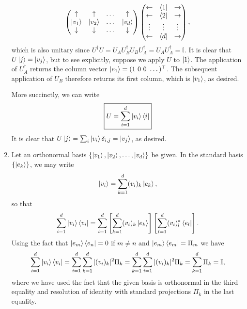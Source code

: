 \documentclass{article}
\theoremstyle{definition}
\newcommand{\lb}{\left[}
\newcommand{\rb}{\right]}
\begin{document}
\begin{enumerate}[label=(\alph*)]
\begin{align*}
\begin{pmatrix}
			\uparrow & \uparrow& \dots & \uparrow\\
			\ket{v_1}& \ket{v_2}& \dots & \ket{v_d}\\
			\downarrow& \downarrow& \dots&\downarrow 
		\end{pmatrix} 
	\begin{pmatrix}
		\leftarrow & \bra{1} &\rightarrow \\
		\leftarrow & \bra{2} &\rightarrow \\
		\vdots & \vdots &\vdots \\
		\leftarrow & \bra{d} &\rightarrow 
	\end{pmatrix},
	\end{align*}
	which is also unitary since $U^\dagger U = U_A U_B^\dagger U_B U_A^\dagger = U_AU_A^\dagger = \mathbb{I}$. It is clear that $U\ket{j} = \ket{v_j}$, but to see explicitly, suppose we apply $U$ to $\ket{1}$. The application of $U_A^\dagger$ returns the column vector $\ket{e_1} = (1\,\, 0 \,\,0 \,\, \dots)^\top$. The subsequent application of $U_B$ therefore returns its first column, which is $\ket{v_1}$, as desired. 
	
	More succinctly, we can write
	\begin{align*}
		\boxed{U = \sum_{i=1}^d \ket{v_i}\bra{i}}
	\end{align*}
	It is clear that $U\ket{j} = \sum_i \ket{v_i}\delta_{i,j} = \ket{v_j} $, as desired. 

	
	
	\item Let an orthonormal basis $\{ \ket{v_1},\ket{v_2},\dots,\ket{v_d} \}$ be given. In the standard basis $\{\ket{e_k}\}$, we may write
	\begin{align*}
		\ket{v_i} = \sum_{k=1}^d (v_i)_k \ket{e_k},
	\end{align*}
	so that
	\begin{align*}
		\sum_{i=1}^d \ket{v_i} \bra{v_i} = \sum_{i=1}^d \lb \sum_{k=1}^d (v_i)_k \ket{e_k}  \rb \lb \sum_{l=1}^d (v_i)^*_l \bra{e_l} \rb. 
	\end{align*}
	Using the fact that $\ket{e_m}\bra{e_n} = 0$ if $m\neq n$ and $\ket{e_m}\bra{e_m} = \Pi_m$ we have
	\begin{align*}
		\sum_{i=1}^d \ket{v_i} \bra{v_i} = \sum_{i=1}^d \sum_{k=1}^d  |(v_i)_k|^2 \Pi_k = \sum_{k=1}^d \sum_{i=1}^d  |(v_i)_k|^2 \Pi_k = \sum_{k=1}^d\Pi_k = \mathbb{I},
	\end{align*}
	where we have used the fact that the given basis is orthonormal in the third equality and resolution of identity with standard projections $\Pi_k$ in the last equality. 
	
\end{enumerate}
\end{document}
